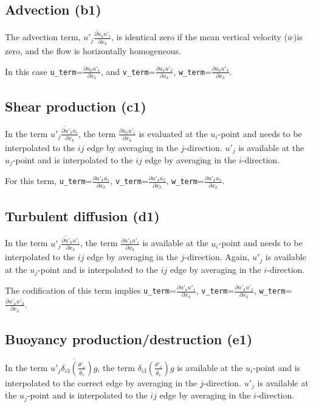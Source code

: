 \documentclass[10pt]{article}
\begin{document}
\subsection{Advection (b1)}
The advection term, $\overline{u'_j \frac{\partial \overline{u_k}u'_i}{\partial{x_k}}}$, 
is identical zero if the mean vertical velocity ($\overline{w}$)is zero, and the flow is horizontally homogeneous.

In this case \verb=u_term==$\frac{\partial \overline{u_k}u'_1}{\partial{x_k}}$, and \verb=v_term==$\frac{\partial \overline{u_k}u'_2}{\partial{x_k}}$, 
\verb=w_term==$\frac{\partial \overline{u_k}u'_3}{\partial{x_k}}$.

\subsection{Shear production (c1)}
In the term $\overline{u'_j \frac{\partial u'_k\overline{u_i}}{\partial{x_k}}}$, the term 
$\frac{\partial \overline{u}_k u'_i}{\partial{x_k}}$ is evaluated at the $u_i$-point and needs to be 
interpolated to the $ij$ edge by averaging in the $j$-direction. $u'_j$ is available at the $u_j$-point and is interpolated 
to the $ij$ edge by averaging in the $i$-direction. 

For this term, \verb=u_term==$\frac{\partial u'_k\overline{u_1}}{\partial{x_k}}$, \verb=v_term==$\frac{\partial u'_k\overline{u_2}}{\partial{x_k}}$, 
\verb=w_term==$\frac{\partial u'_k\overline{u_3}}{\partial{x_k}}$.

\subsection{Turbulent diffusion (d1)}
In the term $\overline{u'_j \frac{\partial  u'_k  u'_i}{\partial{x_k}}}$, the term $\frac{\partial  u'_k  u'_i}{\partial{x_k}}$ 
is available at the $u_i$-point and needs to be interpolated to the $ij$ edge by averaging in the $j$-direction. 
Again, $u'_j$ is available at the $u_j$-point and is interpolated to the $ij$ edge by averaging in the $i$-direction.

The codification of this term implies 
\verb=u_term==$\frac{\partial u'_k u'_1}{\partial{x_k}}$, \verb=v_term==$\frac{\partial u'_k u'_2}{\partial{x_k}}$,
\verb=w_term==$\frac{\partial u'_k u'_3}{\partial{x_k}}$.

\subsection{Buoyancy production/destruction (e1)}
In the term $\overline{u'_j \delta_{i3} \left( \frac{\theta'_v}{\overline{\theta}_v} \right) g }$, the term 
$\delta_{i3} \left( \frac{\theta'_v}{\overline{\theta}_v} \right) g$ is available at the $u_i$-point and is interpolated 
to the correct edge by averaging in the $j$-direction. $u'_j$ is available at the $u_j$-point and is interpolated 
to the $ij$ edge by averaging in the $i$-direction.
\end{document}
